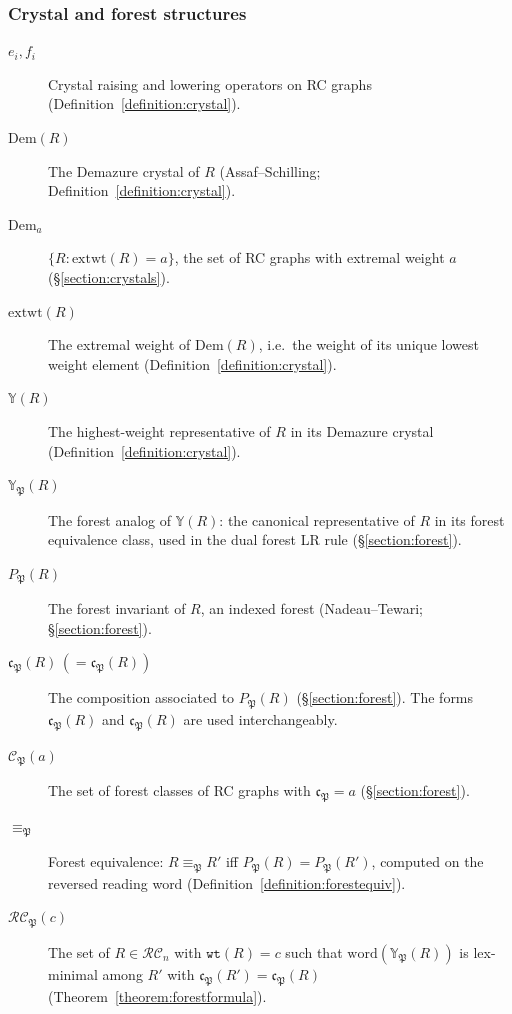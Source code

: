 \documentclass{amsart}
\theoremstyle{definition}
\theoremstyle{remark}
\numberwithin{equation}{subsection}
\newcommand{\wtt}{\mathtt{wt}}
\newcommand{\RC}{\mathcal{RC}}
\newcommand{\code}{\mathfrak{c}}
\newcommand{\forest}{\mathfrak{P}}
\newcommand{\fcode}{\mathfrak{c}_\forest}
\newcommand{\finv}{P_{\forest}}
\begin{document}
\subsubsection*{Crystal and forest structures}
\begin{description}
\item[$e_i,f_i$] Crystal raising and lowering operators on RC graphs (Definition~\ref{definition:crystal}).
\item[$\mathrm{Dem}(R)$] The Demazure crystal of $R$ (Assaf--Schilling; Definition~\ref{definition:crystal}).
\item[$\mathrm{Dem}_a$] $\{R:\mathrm{extwt}(R)=a\}$, the set of RC graphs with extremal weight $a$ (\S\ref{section:crystals}).
\item[$\mathrm{extwt}(R)$] The extremal weight of $\mathrm{Dem}(R)$, i.e.\ the weight of its unique lowest weight element (Definition~\ref{definition:crystal}).
\item[$\mathbb{Y}(R)$] The highest-weight representative of $R$ in its Demazure crystal (Definition~\ref{definition:crystal}).
\item[$\mathbb{Y}_\forest(R)$] The forest analog of $\mathbb{Y}(R)$: the canonical representative of $R$ in its forest equivalence class, used in the dual forest LR rule (\S\ref{section:forest}).
\item[$\finv(R)$] The forest invariant of $R$, an indexed forest (Nadeau--Tewari; \S\ref{section:forest}).
\item[$\fcode(R)\,(=\code_\forest(R))$] The composition associated to $\finv(R)$ (\S\ref{section:forest}). The forms $\fcode(R)$ and $\code_\forest(R)$ are used interchangeably.
\item[$\mathcal{C}_\forest(a)$] The set of forest classes of RC graphs with $\fcode=a$ (\S\ref{section:forest}).
\item[$\equiv_\forest$] Forest equivalence: $R\equiv_\forest R'$ iff $\finv(R)=\finv(R')$, computed on the reversed reading word (Definition~\ref{definition:forestequiv}).
\item[$\RC_\forest(c)$] The set of $R\in\RC_n$ with $\wtt(R)=c$ such that $\mathrm{word}(\mathbb{Y}_\forest(R))$ is lex-minimal among $R'$ with $\code_\forest(R')=\code_\forest(R)$ (Theorem~\ref{theorem:forestformula}).
\end{description}
\end{document}
